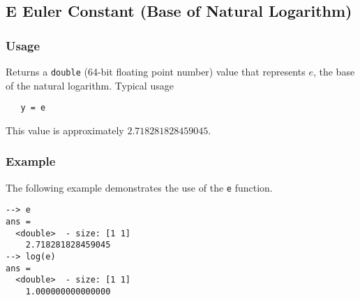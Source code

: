%
%
%
\subsection{E Euler Constant (Base of Natural Logarithm)}
\subsubsection{Usage}
Returns a \verb|double| (64-bit floating point number) value that represents $e$, the base of the natural logarithm.  Typical usage 
\begin{verbatim}
   y = e
\end{verbatim}
This value is approximately $2.718281828459045$.
\subsubsection{Example}
The following example demonstrates the use of the \verb|e| function.
\begin{verbatim}
--> e
ans =
  <double>  - size: [1 1]
    2.718281828459045
--> log(e)
ans =
  <double>  - size: [1 1]
    1.000000000000000
\end{verbatim}
